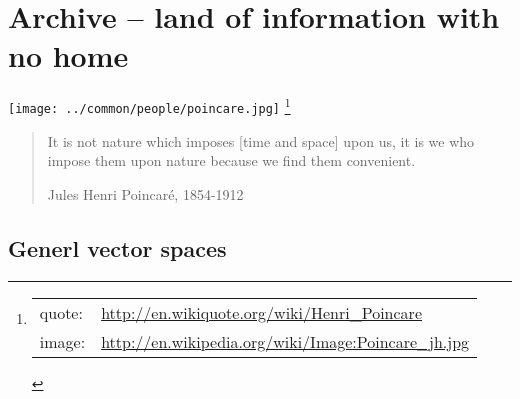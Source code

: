 
\chapter{Archive -- land of information with no home}
\label{chp:archive}
\texttt{[image: ../common/people/poincare.jpg]}
\footnote{\begin{tabular}[t]{ll}
  quote: & \url{http://en.wikiquote.org/wiki/Henri_Poincare} \\
  image: & \url{http://en.wikipedia.org/wiki/Image:Poincare_jh.jpg}
\end{tabular}}
\parbox[b][5cm][c]{12cm}{
  \begin{quote}
  It is not nature which imposes [time and space] upon us, 
  it is we who impose them upon nature because 
  we find them convenient. 

  Jules Henri Poincar\'e, 1854-1912
  \end{quote}
}

\section{Generl vector spaces}










